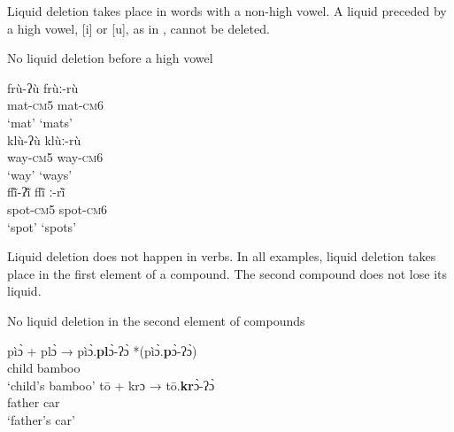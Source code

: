 \documentclass[output=paper]{langscibook}
\begin{document}
Liquid deletion takes place in words with a non-high vowel. A liquid preceded by a high vowel, [i] or [u], as in , cannot be deleted. 

\begin{exe}
    \ex  No liquid deletion before a high vowel  \label{ex:traore:31}\\
    \begin{multicols}{2}
    \begin{xlist}
        \ex  \glll frù-ʔù         frùː-rù  \\
              mat-\textsc{cm}5    mat-\textsc{cm}6\\
              `mat' `mats'\\
        \ex  klù-ʔù          klùː-rù \\
        way-\textsc{cm}5      way-\textsc{cm}6 \\
        `way' `ways'\\
        \ex \glll   flĩ̀-ʔĩ̀             flĩ̀ ː-rĩ̀   \\
        spot-\textsc{cm}5      spot-\textsc{cm}6\\
        `spot' `spots'\\
    \end{xlist}
    \end{multicols}
 \end{exe}

Liquid deletion does not happen in verbs.
In all examples, liquid deletion takes place in the first element of a compound. The second compound does not lose its liquid.

\begin{exe}
  \ex No liquid deletion in the second element of compounds\label{ex:traore:32}\\
  \begin{xlist}
    \ex \gll pìɔ̀      +          plɔ̀                           →            pìɔ̀.\textbf{pl}ɔ̀-ʔɔ̀    *(pìɔ̀.\textbf{p}ɔ̀-ʔɔ̀)\\
    child               {}    bamboo                           {}         {}  {}\\
    \trans ‘child’s bamboo’  
    \ex  \gll tō            +          krɔ                           →            tō.\textbf{kr}ɔ̀-ʔɔ̀  \\            father         {}       car                            {}            {}\\
    \trans ‘father’s car’
    \end{xlist}
 \end{exe}
\end{document}
